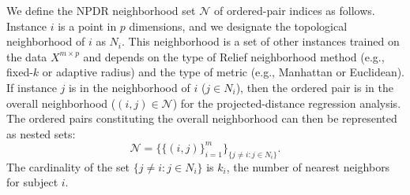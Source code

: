 \documentclass{bioinfo}
\begin{document}
We define the NPDR neighborhood set $\mathcal{N}$ of ordered-pair indices as follows.
Instance $i$ is a point in $p$ dimensions, and we designate the topological neighborhood of $i$ as $N_{i}$.
This neighborhood is a set of other instances trained on the data $X^{m \times p}$ and depends on the type of Relief neighborhood method (e.g., fixed-$k$ or adaptive radius) and the type of metric (e.g., Manhattan or Euclidean).
If instance $j$ is in the neighborhood of $i$ ($j \in N_{i}$), then the ordered pair is in the overall neighborhood ($(i,j) \in \mathcal{N}$) for the projected-distance regression analysis.
The ordered pairs constituting the overall neighborhood can then be represented as nested sets:
\begin{equation}\label{eq:N}
\mathcal{N}=\{\{(i, j)\}_{i=1}^{m}\}_{\{j \ne i : j \in N_{i}\}}.
\end{equation}
The cardinality of the set $\{j \ne i : j \in N_{i}\}$ is $k_i$, the number of nearest neighbors for subject $i$.

\end{document}
